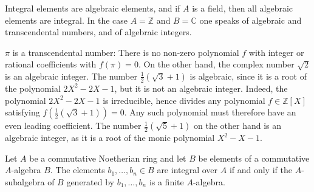 \documentclass[12pt, a4paper]{article}
\begin{document}
\begin{example}
    Integral elements are algebraic elements, and if \( A \) is a field, then all algebraic elements are integral. In the case \( A = \mathbb{Z} \) and \( B = \mathbb{C} \) one speaks of algebraic and transcendental numbers, and of algebraic integers.
\end{example}

\begin{mdexample}
    \( \pi \) is a transcendental number: There is no non-zero polynomial \( f \) with integer or rational coefficients with \( f(\pi) = 0 \). On the other hand, the complex number \( \sqrt{2} \) is an algebraic integer. The number \(\frac{1}{2}(\sqrt{3} + 1)\) is algebraic, since it is a root of the polynomial \(2X^2 - 2X - 1\), but it is not an algebraic integer. Indeed, the polynomial \(2X^2 - 2X - 1\) is irreducible, hence divides any polynomial \(f \in \mathbb{Z}[X]\) satisfying \(f\left(\frac{1}{2}(\sqrt{3} + 1)\right) = 0\). Any such polynomial must therefore have an even leading coefficient. The number  \(\frac{1}{2}(\sqrt{5} + 1)\) on the other hand is an algebraic integer, as it is a root of the monic polynomial \(X^2 - X - 1. \)
\end{mdexample}

\begin{lemma}
    Let \( A \) be a commutative Noetherian ring and let \( B \) be elements of a commutative \( A \)-algebra \( B \). The elements \( b_1, \ldots, b_n \in B \) are integral over \( A \) if and only if the \( A \)-subalgebra of \( B \) generated by \( b_1, \ldots, b_n \) is a finite \( A \)-algebra.
\end{lemma}
\end{document}
